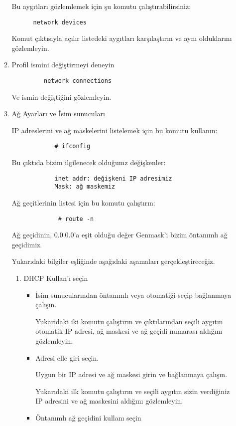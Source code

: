 \documentclass[a4paper,10pt]{article}
\begin{document}
\begin{enumerate}
\begin{enumerate}
	  Bu aygıtları gözlemlemek için şu komutu çalıştırabilirsiniz:
	  \begin{verbatim}
	  network devices
	  \end{verbatim}
	  Komut çıktısıyla açılır listedeki aygıtları karşılaştırın ve aynı olduklarını gözlemleyin.

	  \item Profil ismini değiştirmeyi deneyin
	    \begin{verbatim}
	     network connections
	    \end{verbatim}
	    Ve ismin değiştiğini gözlemleyin.
   
   	  \item Ağ Ayarları ve İsim sunucuları

	    IP adreslerini ve ağ maskelerini listelemek için bu komutu kullanın:
		  \begin{verbatim}
		    # ifconfig
		  \end{verbatim}
	   Bu çıktıda bizim ilgilenecek olduğumz değişkenler:
		   \begin{verbatim}
		    inet addr: değişkeni IP adresimiz
		    Mask: ağ maskemiz
		  \end{verbatim}
	   Ağ geçitlerinin listesi için bu komutu çalıştırın:
	    	   \begin{verbatim}
		     # route -n 
		  \end{verbatim}
	   Ağ geçidinin, 0.0.0.0'a eşit olduğu değer Genmask'i bizim öntanımlı ağ geçidimiz.

	Yukarıdaki bilgiler eşliğinde aşağıdaki aşamaları gerçekleştireceğiz.
	      \begin{enumerate} 
	      \item DHCP Kullan'ı seçin
		\begin{itemize}
		  \item İsim sunucularından öntanımlı veya otomatiği seçip bağlanmaya çalışın.
				      
		   Yukarıdaki iki komutu çalıştırın ve çıktılarından seçili aygıtın otomatik IP adresi, ağ maskesi ve ağ geçidi numarası aldığını gözlemleyin.

		  \item Adresi elle giri seçin.

		   Uygun bir IP adresi ve ağ maskesi girin ve bağlanmaya çalışın.
		
		   Yukarıdaki ilk komutu çalıştırın ve seçili aygıtın sizin verdiğiniz IP adresini ve ağ maskesini aldığını gözlemleyin.
  
		  \item Öntanımlı ağ geçidini kullanı seçin


\end{itemize}
\end{enumerate}
\end{enumerate}
\end{enumerate}
\end{document}
